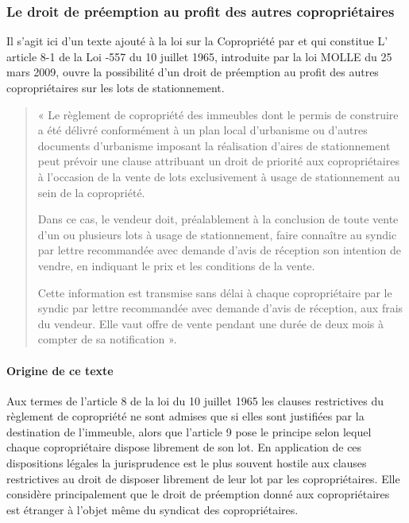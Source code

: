		\subsubsection{Le droit de préemption au profit des autres copropriétaires}
			
			Il s’agit ici d’un texte ajouté à la loi sur la Copropriété par et qui constitue L’ article 8-1 de la Loi -557 du 10 juillet 1965, introduite par la loi MOLLE du 25 mars 2009, ouvre la possibilité d’un droit de
			préemption au profit des autres copropriétaires sur les lots de stationnement.
			
			\begin{quote}
				« Le règlement de copropriété des immeubles dont le permis de construire a été délivré conformément à
				un plan local d'urbanisme ou d'autres documents d'urbanisme imposant la réalisation d'aires de
				stationnement peut prévoir une clause attribuant un droit de priorité aux copropriétaires à l'occasion de la
				vente de lots exclusivement à usage de stationnement au sein de la copropriété.
			
				Dans ce cas, le vendeur doit, préalablement à la conclusion de toute vente d'un ou plusieurs lots à usage
				de stationnement, faire connaître au syndic par lettre recommandée avec demande d'avis de réception son
				intention de vendre, en indiquant le prix et les conditions de la vente.
				
				Cette information est transmise sans délai à chaque copropriétaire par le syndic par lettre recommandée
				avec demande d'avis de réception, aux frais du vendeur. Elle vaut offre de vente pendant une durée de deux
				mois à compter de sa notification ».
			\end{quote}
		
			\paragraph{Origine de ce texte}
			
			\par Aux termes de l'article 8 de la loi du 10 juillet 1965 les clauses restrictives du règlement de copropriété ne
			sont admises que si elles sont justifiées par la destination de l'immeuble, alors que l'article 9 pose le
			principe selon lequel chaque copropriétaire dispose librement de son lot. En application de ces dispositions
			légales la jurisprudence est le plus souvent hostile aux clauses restrictives au droit de disposer librement
			de leur lot par les copropriétaires. Elle considère principalement que le droit de préemption donné aux
			copropriétaires est étranger à l'objet même du syndicat des copropriétaires.
			
